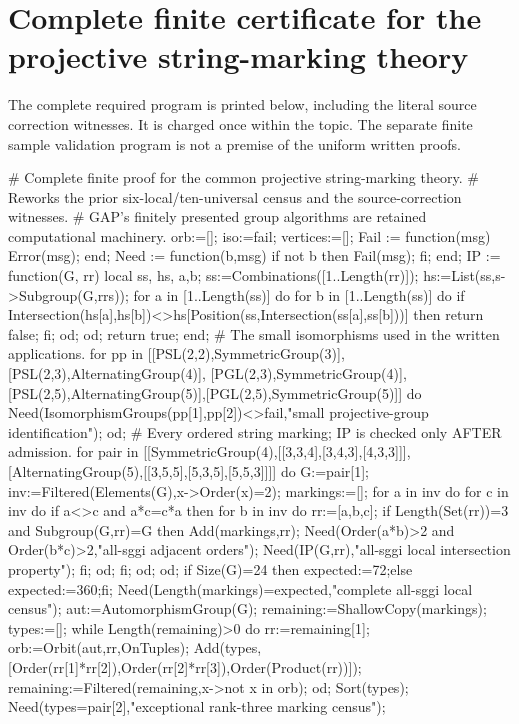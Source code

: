 \documentclass[11pt,a4paper]{article}
\begin{document}
\section*{Complete finite certificate for the projective string-marking theory}
The complete required program is printed below, including the literal source
correction witnesses. It is charged once within the topic. The separate finite
sample validation program is not a premise of the uniform written proofs.
\begin{CompleteProgram}
# Complete finite proof for the common projective string-marking theory.
# Reworks the prior six-local/ten-universal census and the source-correction witnesses.
# GAP's finitely presented group algorithms are retained computational machinery.
orb:=[]; iso:=fail; vertices:=[];
Fail := function(msg) Error(msg); end;
Need := function(b,msg) if not b then Fail(msg); fi; end;
IP := function(G, rr)
  local ss, hs, a,b;
  ss:=Combinations([1..Length(rr)]);
  hs:=List(ss,s->Subgroup(G,rr{s}));
  for a in [1..Length(ss)] do for b in [1..Length(ss)] do
    if Intersection(hs[a],hs[b])<>hs[Position(ss,Intersection(ss[a],ss[b]))] then return false; fi;
  od; od; return true;
end;
# The small isomorphisms used in the written applications.
for pp in [[PSL(2,2),SymmetricGroup(3)],[PSL(2,3),AlternatingGroup(4)],
           [PGL(2,3),SymmetricGroup(4)],[PSL(2,5),AlternatingGroup(5)],[PGL(2,5),SymmetricGroup(5)]] do
  Need(IsomorphismGroups(pp[1],pp[2])<>fail,"small projective-group identification");
od;
# Every ordered string marking; IP is checked only AFTER admission.
for pair in [[SymmetricGroup(4),[[3,3,4],[3,4,3],[4,3,3]]],
             [AlternatingGroup(5),[[3,5,5],[5,3,5],[5,5,3]]]] do
  G:=pair[1]; inv:=Filtered(Elements(G),x->Order(x)=2); markings:=[];
  for a in inv do for c in inv do if a<>c and a*c=c*a then
    for b in inv do rr:=[a,b,c];
      if Length(Set(rr))=3 and Subgroup(G,rr)=G then
        Add(markings,rr);
        Need(Order(a*b)>2 and Order(b*c)>2,"all-sggi adjacent orders");
        Need(IP(G,rr),"all-sggi local intersection property");
      fi;
    od;
  fi; od; od;
  if Size(G)=24 then expected:=72;else expected:=360;fi;
  Need(Length(markings)=expected,"complete all-sggi local census");
  aut:=AutomorphismGroup(G); remaining:=ShallowCopy(markings); types:=[];
  while Length(remaining)>0 do
    rr:=remaining[1]; orb:=Orbit(aut,rr,OnTuples);
    Add(types,[Order(rr[1]*rr[2]),Order(rr[2]*rr[3]),Order(Product(rr))]);
    remaining:=Filtered(remaining,x->not x in orb);
  od;
  Sort(types); Need(types=pair[2],"exceptional rank-three marking census");

\end{CompleteProgram}
\end{document}
